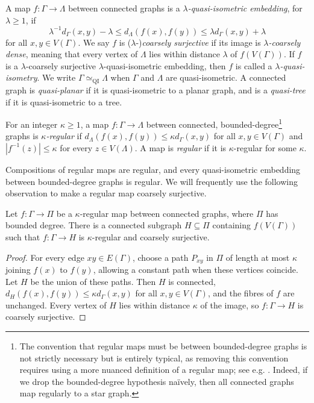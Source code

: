 \documentclass[a4paper]{amsart}
\begin{document}
A map $f:\Gamma\to \Lambda$ between connected graphs is a \emph{$\lambda$-quasi-isometric embedding}, for $\lambda\geq1$, if
\begin{equation}\label{eq:quasi-isometry-inequalities}
\lambda^{-1}d_\Gamma(x,y)-\lambda\leq d_\Lambda(f(x),f(y))\leq\lambda d_\Gamma(x,y)+\lambda
\end{equation}
for all $x,y\in V(\Gamma)$.
We say $f$ is ($\lambda$-)\emph{coarsely surjective} if its image is \emph{$\lambda$-coarsely dense}, meaning that every vertex of $\Lambda$ lies within distance $\lambda$ of $f(V(\Gamma))$. If $f$ is a $\lambda$-coarsely surjective $\lambda$-quasi-isometric embedding,  then $f$ is called a \emph{$\lambda$-quasi-isometry}.
We write $\Gamma\simeq_{\mathrm{QI}}\Lambda$ when $\Gamma$ and $\Lambda$ are quasi-isometric.
A connected graph is \emph{quasi-planar} if it is quasi-isometric to a planar graph, and is a \emph{quasi-tree} if it is quasi-isometric to a tree.


\begin{definition}\label{def:regular-map}
For an integer $\kappa\geq1$, a map $f:\Gamma\to\Lambda$ between connected, bounded-degree\footnote{The convention that regular maps must be between bounded-degree graphs is not strictly necessary but is entirely typical, as removing this convention requires using a more nuanced definition of a regular map; see e.g. \cite[Sec.~5.1]{hume2020poincare}. Indeed, if we drop the bounded-degree hypothesis na\"ively, then all connected graphs map regularly to a star graph.} 
graphs is \emph{$\kappa$-regular} if $d_\Lambda(f(x),f(y))\leq\kappa d_\Gamma(x,y)$ for all $x,y\in V(\Gamma)$ and $|f^{-1}(z)|\leq\kappa$ for every $z\in V(\Lambda)$.
A map is \emph{regular} if it is $\kappa$-regular for some $\kappa$.
\end{definition}

Compositions of regular maps are regular, and every quasi-isometric embedding between bounded-degree graphs is regular.
We will frequently use the following observation to make a regular map coarsely surjective.

\begin{lemma}\label{lem:regular-connected-image}
Let $f:\Gamma\to\Pi$ be a $\kappa$-regular map between connected graphs, where $\Pi$ has bounded degree.
There is a connected subgraph $H\subseteq\Pi$ containing $f(V(\Gamma))$ such that $f:\Gamma\to H$ is $\kappa$-regular and coarsely surjective.
\end{lemma}

\begin{proof}
For every edge $xy\in E(\Gamma)$, choose a path $P_{xy}$ in $\Pi$ of length at most $\kappa$ joining $f(x)$ to $f(y)$, allowing a constant path when these vertices coincide.
Let $H$ be the union of these paths.
Then $H$ is connected, $d_H(f(x),f(y))\leq \kappa d_\Gamma(x,y)$ for all $x,y\in V(\Gamma)$, and the fibres of $f$ are unchanged.
Every vertex of $H$ lies within distance $\kappa$ of the image, so $f:\Gamma\to H$ is coarsely surjective.
\end{proof}
\end{document}
